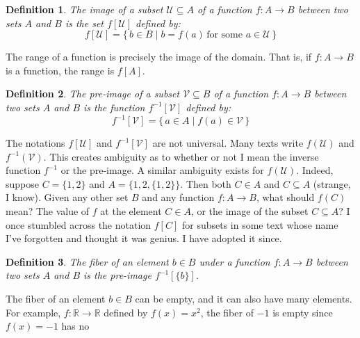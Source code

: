 \documentclass{article}
\theoremstyle{plain}
\theoremstyle{normal}
\newtheorem{definition}{Definition}[section]
\begin{document}
        \begin{definition}
            The image of a subset $\mathcal{U}\subseteq{A}$ of a function
            $f:A\rightarrow{B}$ between two sets $A$ and $B$ is the set
            $f[\mathcal{U}]$ defined by:
            \begin{equation}
                f[\mathcal{U}]=\{\,b\in{B}\;|\;
                    b=f(a)\,\textrm{for some }a\in\mathcal{U}\,\}
            \end{equation}
        \end{definition}
        The range of a function is precisely the image of the domain. That is,
        if $f:A\rightarrow{B}$ is a function, the range is $f[A]$.
        \begin{definition}
            The pre-image of a subset $\mathcal{V}\subseteq{B}$ of a function
            $f:A\rightarrow{B}$ between two sets $A$ and $B$ is the function
            $f^{-1}[\mathcal{V}]$ defined by:
            \begin{equation}
                f^{-1}[\mathcal{V}]=\{\,a\in{A}\;|\;
                    f(a)\in\mathcal{V}\,\}
            \end{equation}
        \end{definition}
        The notations $f[\mathcal{U}]$ and $f^{-1}[\mathcal{V}]$ are not
        universal. Many texts write $f(\mathcal{U})$ and
        $f^{-1}(\mathcal{V})$. This creates ambiguity as to whether or not I
        mean the inverse function $f^{-1}$ or the pre-image. A similar
        ambiguity exists for $f(\mathcal{U})$. Indeed, suppose
        $C=\{1,2\}$ and $A=\{1,2,\{1,2\}\}$. Then both $C\in{A}$ and
        $C\subseteq{A}$ (strange, I know). Given any other set $B$ and any
        function $f:A\rightarrow{B}$, what should $f(C)$ mean? The value of
        $f$ at the element $C\in{A}$, or the image of the subset
        $C\subseteq{A}$? I once stumbled across the notation
        $f[C]$ for subsets in some text whose name I've forgotten and thought
        it was genius. I have adopted it since.
        \begin{definition}
            The fiber of an element $b\in{B}$ under a function
            $f:A\rightarrow{B}$ between two sets $A$ and $B$ is the pre-image
            $f^{-1}[\{b\}]$.
        \end{definition}
        The fiber of an element $b\in{B}$ can be empty, and it can also have
        many elements. For example, $f:\mathbb{R}\rightarrow\mathbb{R}$ defined
        by $f(x)=x^2$, the fiber of $-1$ is empty since $f(x)=-1$ has no
\end{document}
